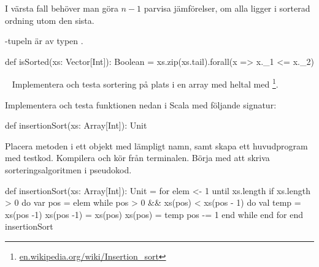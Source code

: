 \SubtaskSolved I värsta fall behöver man göra $n - 1$ parvisa jämförelser, om alla ligger i sorterad ordning utom den sista.


-tupeln är av typen .

\begin{Code}
def isSorted(xs: Vector[Int]): Boolean =
  xs.zip(xs.tail).forall(x => x._1 <= x._2)
\end{Code}



\QUESTEND







\QUESTBEGIN

\Task  \what~ Implementera och testa sortering på plats i en array med heltal med \footnote{\href{https://en.wikipedia.org/wiki/Insertion_sort}{en.wikipedia.org/wiki/Insertion\_sort}}.

Implementera och testa funktionen nedan i Scala med följande signatur:
\begin{Code}
  def insertionSort(xs: Array[Int]): Unit
\end{Code}
Placera metoden i ett objekt med lämpligt namn, samt skapa ett huvudprogram med testkod. Kompilera och kör från terminalen. Börja med att skriva sorteringsalgoritmen i pseudokod.


\SOLUTION


\TaskSolved \what


\begin{Code}
def insertionSort(xs: Array[Int]): Unit = 
  for elem <- 1 until xs.length if xs.length > 0 do
    var pos = elem
    while pos > 0 && xs(pos) < xs(pos - 1) do
      val temp = xs(pos -1)
      xs(pos -1) = xs(pos)
      xs(pos) = temp
      pos -= 1
    end while
  end for
end insertionSort
\end{Code}



